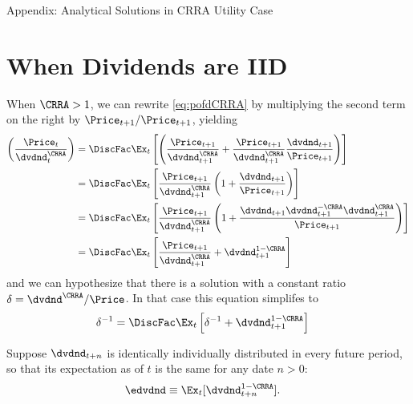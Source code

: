 \documentclass{\handout}
\begin{document}
\pagebreak
\appendix {} %

\appendix
\centerline{\Large Appendix:  Analytical Solutions in CRRA Utility Case}

\medskip\medskip\medskip

\section{When Dividends are IID}
\newcommand{\dCRRAoverP}{\delta}
\newcommand{\PoverdCRRA}{\delta^{-1}}

When $\CRRA > 1$, we can rewrite \eqref{eq:pofdCRRA} by multiplying the second term on the right by $\Price_{t+1}/\Price_{t+1}$, yielding
\begin{equation}\begin{gathered}\begin{aligned}
      \left(\frac{\Price_{t}}{\dvdnd_{t}^{\CRRA}}\right) & =  \DiscFac \Ex_{t}\left[\left(\frac{\Price_{t+1}}{\dvdnd_{t+1}^{\CRRA}}+\frac{\Price_{t+1}}{\dvdnd_{t+1}^{\CRRA}}\frac{\dvdnd_{t+1}}{\Price_{t+1}}\right)\right] \label{eq:PoverdCRRA}
      \\ & =  \DiscFac \Ex_{t}\left[\frac{\Price_{t+1}}{\dvdnd_{t+1}^{\CRRA}}\left(1+\frac{\dvdnd_{t+1}}{\Price_{t+1}}\right)\right]
      \\ & =  \DiscFac \Ex_{t}\left[\frac{\Price_{t+1}}{\dvdnd_{t+1}^{\CRRA}}\left(1+\frac{\dvdnd_{t+1}\dvdnd_{t+1}^{-\CRRA}\dvdnd_{t+1}^{\CRRA}}{\Price_{t+1}}\right)\right]       
      \\ & =  \DiscFac \Ex_{t}\left[\frac{\Price_{t+1}}{\dvdnd_{t+1}^{\CRRA}}+\dvdnd_{t+1}^{1-\CRRA}\right]
    \end{aligned}\end{gathered}\end{equation}
and we can hypothesize that there is a solution with a constant ratio $\dCRRAoverP=\dvdnd^{\CRRA}/\Price$.  In that case this equation simplifes to 
\begin{equation}\begin{gathered}\begin{aligned}
      \PoverdCRRA & =  \DiscFac \Ex_{t}\left[\PoverdCRRA+\dvdnd_{t+1}^{1-\CRRA}\right]     \label{eq:recursive}
    \end{aligned}\end{gathered}\end{equation}

Suppose $\dvdnd_{t+n}$ is identically individually distributed in every future period, so that its expectation as of $t$ is the same for any date $n>0$:
\begin{equation}\begin{gathered}\begin{aligned}
  \edvdnd & \equiv  \Ex_{t}[\dvdnd_{t+n}^{1-\CRRA}].   \label{eq:dmod}
\end{aligned}\end{gathered}\end{equation}
\end{document}
